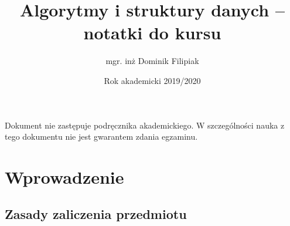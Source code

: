 \documentclass[10pt, oneside]{article}
\title{Algorytmy i struktury danych -- notatki do kursu}
\author{mgr. inż Dominik Filipiak}
\date{Rok akademicki 2019/2020}
\begin{document}
\maketitle
\tableofcontents

\vspace{.25in}

Dokument nie zastępuje podręcznika akademickiego.
W szczególności nauka z tego dokumentu nie jest gwarantem zdania egzaminu.

\section{Wprowadzenie}

\subsection{Zasady zaliczenia przedmiotu}
\end{document}
